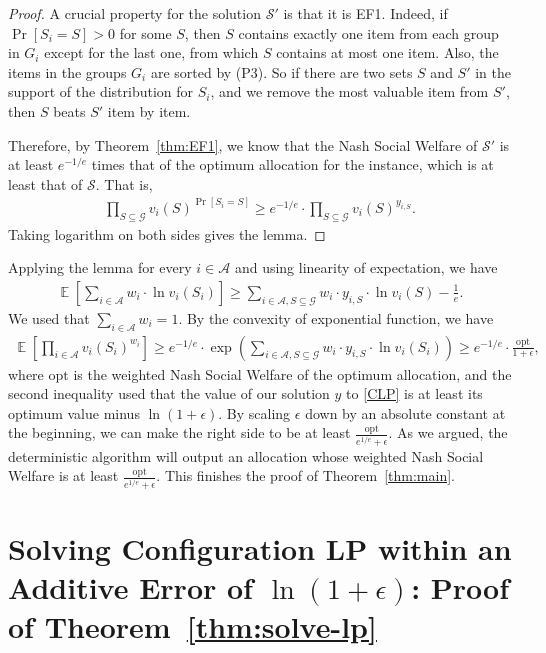 \documentclass{theoretics}
\newcommand\calS{{\mathcal{S}}}
\newcommand\calA{{\mathcal{A}}}
\newcommand\calG{{\mathcal{G}}}
\DeclareMathOperator{\E}{\mathbb{E}}
\begin{document}
\begin{proof}
        A crucial property for the solution $\calS'$ is that it is EF1. Indeed, if $\Pr[S_i = S] > 0$ for some $S$, then $S$ contains exactly one item from each group in $G_i$ except for the last one, from which $S$ contains at most one item. Also, the items in the groups $G_i$ are sorted by (P3).  So if there are two sets $S$ and $S'$ in the support of the distribution for $S_i$, and we remove the most valuable item from $S'$, then $S$ beats $S'$ item by item. 
        
        Therefore, by Theorem~\ref{thm:EF1}, we know that the Nash Social Welfare of $\calS'$ is at least $e^{-1/e}$ times that of the optimum allocation for the instance, which is at least that of $\calS$. That is, 
        \begin{align*}
            \prod_{S \subseteq \calG} v_i(S)^{\Pr[S_i = S]} \geq e^{-1/e} \cdot \prod_{S \subseteq \calG} v_i(S)^{y_{i, S}}.
        \end{align*}
        Taking logarithm on both sides gives the lemma. 
    \end{proof}

    Applying the lemma for every $i \in \calA$ and using linearity of expectation, we have 
    \begin{align*}
        \E\left[\sum_{i \in \calA}w_i \cdot \ln v_i(S_i)\right] \geq \sum_{i \in \calA, S \subseteq \calG} w_i \cdot y_{i, S} \cdot \ln v_i(S) - \frac1e.
    \end{align*}
    We used that $\sum_{i \in \calA} w_i = 1$. 
    By the convexity of exponential function, we have 
    \begin{align*}
        \E\left[\prod_{i \in \calA}v_i(S_i)^{w_i}\right] \geq e^{-1/e} \cdot \exp\left(\sum_{i \in \calA, S \subseteq \calG} w_i \cdot y_{i, S} \cdot \ln v_i(S_i)\right) \geq e^{-1/e} \cdot \frac{\text{opt}}{1 + \epsilon},
    \end{align*}
    where $\text{opt}$ is the weighted Nash Social Welfare of the optimum allocation, and the second inequality used that the value of our solution $y$ to \eqref{CLP} is at least its optimum value minus $\ln(1+\epsilon)$.
    By scaling $\epsilon$ down by an absolute constant at the beginning, we can make the right side to be at least $\frac{\text{opt}}{e^{1/e} + \epsilon}$. As we argued, the deterministic algorithm will output an allocation whose weighted Nash Social Welfare is at least $\frac{\text{opt}}{e^{1/e} + \epsilon}$. This finishes the proof of Theorem~\ref{thm:main}.

    
\section{Solving Configuration LP within an Additive Error of \texorpdfstring{$\ln (1 + \epsilon)$}{log (1 + epsilon)}: Proof of Theorem~\ref{thm:solve-lp}} \label{sec:solving-LP}
\end{document}

